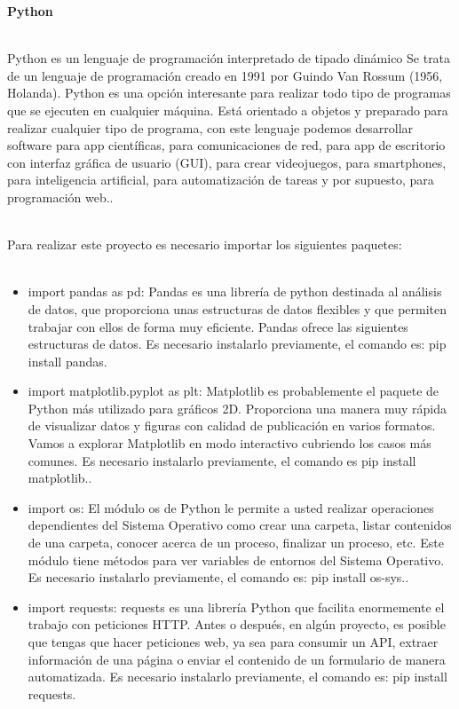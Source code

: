 \documentclass[conference,compsoc,onecolumn]{IEEEtran}
\begin{document}
\textbf{Python}
\\\

Python es un lenguaje de programación interpretado de tipado dinámico Se trata de un lenguaje de programación creado en 1991 por Guindo Van Rossum (1956, Holanda). Python es una opción interesante para realizar todo tipo de programas que se ejecuten en cualquier máquina. Está orientado a objetos y preparado para realizar cualquier tipo de programa, con este lenguaje podemos desarrollar software para app científicas, para comunicaciones de red, para app de escritorio con interfaz gráfica de usuario (GUI), para crear videojuegos, para smartphones, para inteligencia artificial, para automatización de tareas y por supuesto, para programación web..~\cite{3}
\\\

Para realizar este proyecto es necesario importar los siguientes paquetes:
\\\

\begin{itemize}
\item import pandas as pd: Pandas es una librería de python destinada al análisis de datos, que proporciona unas estructuras de datos flexibles y que permiten trabajar con ellos de forma muy eficiente. Pandas ofrece las siguientes estructuras de datos. Es necesario instalarlo previamente, el comando es: pip install pandas.~\cite{4}
\item import matplotlib.pyplot as plt: Matplotlib es probablemente el paquete de Python más utilizado para gráficos 2D. Proporciona una manera muy rápida de visualizar datos y figuras con calidad de publicación en varios formatos. Vamos a explorar Matplotlib en modo interactivo cubriendo los casos más comunes. Es necesario instalarlo previamente, el comando es pip install matplotlib..~\cite{5}
\item import os: El módulo os de Python le permite a usted realizar operaciones dependientes del Sistema Operativo como crear una carpeta, listar contenidos de una carpeta, conocer acerca de un proceso, finalizar un proceso, etc. Este módulo tiene métodos para ver variables de entornos del Sistema Operativo. Es necesario instalarlo previamente, el comando es: pip install os-sys..~\cite{6}
\item import requests: requests es una librería Python que facilita enormemente el trabajo con peticiones HTTP. Antes o después, en algún proyecto, es posible que tengas que hacer peticiones web, ya sea para consumir un API, extraer información de una página o enviar el contenido de un formulario de manera automatizada. Es necesario instalarlo previamente, el comando es: pip install requests.~\cite{7}
\end{itemize}
\\\
\end{document}
